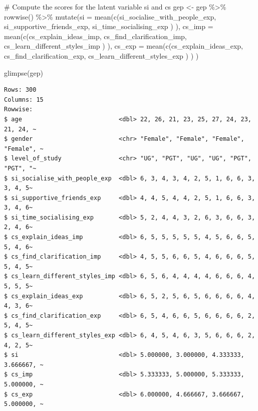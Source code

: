 \documentclass[
  letterpaper,
]{krantz}
\makeatletter
\newenvironment{Shaded}{\begin{snugshade}}{\end{snugshade}}
\newcommand{\AttributeTok}[1]{\textcolor[rgb]{0.40,0.45,0.13}{#1}}
\newcommand{\CommentTok}[1]{\textcolor[rgb]{0.37,0.37,0.37}{#1}}
\newcommand{\FunctionTok}[1]{\textcolor[rgb]{0.28,0.35,0.67}{#1}}
\newcommand{\NormalTok}[1]{\textcolor[rgb]{0.00,0.23,0.31}{#1}}
\newcommand{\OtherTok}[1]{\textcolor[rgb]{0.00,0.23,0.31}{#1}}
\newcommand{\SpecialCharTok}[1]{\textcolor[rgb]{0.37,0.37,0.37}{#1}}
\newenvironment{kframe}{%
\medskip{}
\setlength{\fboxsep}{.8em}
 \def\at@end@of@kframe{}%
 \ifinner\ifhmode%
  \def\at@end@of@kframe{\end{minipage}}%
  \begin{minipage}{\columnwidth}%
 \fi\fi%
 \def\FrameCommand##1{\hskip\@totalleftmargin \hskip-\fboxsep
 \colorbox{shadecolor}{##1}\hskip-\fboxsep
     \hskip-\linewidth \hskip-\@totalleftmargin \hskip\columnwidth}%
 \MakeFramed {\advance\hsize-\width
   \@totalleftmargin\z@ \linewidth\hsize
   \@setminipage}}%
 {\par\unskip\endMakeFramed%
 \at@end@of@kframe}
\renewenvironment{Shaded}{\begin{kframe}}{\end{kframe}}
\makeatother
\begin{document}
\begin{Shaded}
\begin{Highlighting}[]
\CommentTok{\# Compute the scores for the latent variable \textquotesingle{}si\textquotesingle{} and \textquotesingle{}cs\textquotesingle{}}
\NormalTok{gep }\OtherTok{\textless{}{-}}
\NormalTok{  gep }\SpecialCharTok{\%\textgreater{}\%}
  \FunctionTok{rowwise}\NormalTok{() }\SpecialCharTok{\%\textgreater{}\%}
  \FunctionTok{mutate}\NormalTok{(}\AttributeTok{si =} \FunctionTok{mean}\NormalTok{(}\FunctionTok{c}\NormalTok{(si\_socialise\_with\_people\_exp,}
\NormalTok{                     si\_supportive\_friends\_exp,}
\NormalTok{                     si\_time\_socialising\_exp}
\NormalTok{                     )}
\NormalTok{                   ),}
         \AttributeTok{cs\_imp =} \FunctionTok{mean}\NormalTok{(}\FunctionTok{c}\NormalTok{(cs\_explain\_ideas\_imp,}
\NormalTok{                         cs\_find\_clarification\_imp,}
\NormalTok{                         cs\_learn\_different\_styles\_imp}
\NormalTok{                         )}
\NormalTok{                       ),}
         \AttributeTok{cs\_exp =} \FunctionTok{mean}\NormalTok{(}\FunctionTok{c}\NormalTok{(cs\_explain\_ideas\_exp,}
\NormalTok{                         cs\_find\_clarification\_exp,}
\NormalTok{                         cs\_learn\_different\_styles\_exp}
\NormalTok{                         )}
\NormalTok{                       )}
\NormalTok{         )}

\FunctionTok{glimpse}\NormalTok{(gep)}
\end{Highlighting}
\end{Shaded}

\begin{verbatim}
Rows: 300
Columns: 15
Rowwise: 
$ age                           <dbl> 22, 26, 21, 23, 25, 27, 24, 23, 21, 24, ~
$ gender                        <chr> "Female", "Female", "Female", "Female", ~
$ level_of_study                <chr> "UG", "PGT", "UG", "UG", "PGT", "PGT", "~
$ si_socialise_with_people_exp  <dbl> 6, 3, 4, 3, 4, 2, 5, 1, 6, 6, 3, 3, 4, 5~
$ si_supportive_friends_exp     <dbl> 4, 4, 5, 4, 4, 2, 5, 1, 6, 6, 3, 3, 4, 6~
$ si_time_socialising_exp       <dbl> 5, 2, 4, 4, 3, 2, 6, 3, 6, 6, 3, 2, 4, 6~
$ cs_explain_ideas_imp          <dbl> 6, 5, 5, 5, 5, 5, 4, 5, 6, 6, 5, 5, 4, 6~
$ cs_find_clarification_imp     <dbl> 4, 5, 5, 6, 6, 5, 4, 6, 6, 6, 5, 5, 4, 5~
$ cs_learn_different_styles_imp <dbl> 6, 5, 6, 4, 4, 4, 4, 6, 6, 6, 4, 5, 5, 5~
$ cs_explain_ideas_exp          <dbl> 6, 5, 2, 5, 6, 5, 6, 6, 6, 6, 4, 4, 3, 6~
$ cs_find_clarification_exp     <dbl> 6, 5, 4, 6, 6, 5, 6, 6, 6, 6, 2, 5, 4, 5~
$ cs_learn_different_styles_exp <dbl> 6, 4, 5, 4, 6, 3, 5, 6, 6, 6, 2, 4, 2, 5~
$ si                            <dbl> 5.000000, 3.000000, 4.333333, 3.666667, ~
$ cs_imp                        <dbl> 5.333333, 5.000000, 5.333333, 5.000000, ~
$ cs_exp                        <dbl> 6.000000, 4.666667, 3.666667, 5.000000, ~
\end{verbatim}
\end{document}
